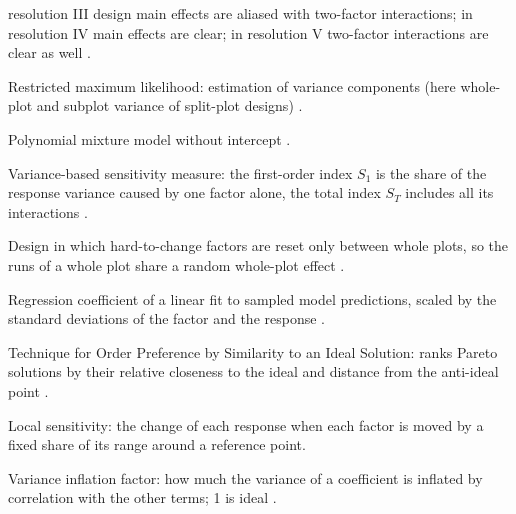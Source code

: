 \begin{description}[style=nextline,leftmargin=2em]
  resolution III design main effects are aliased with two-factor interactions; in resolution IV main effects are
  clear; in resolution V two-factor interactions are clear as well \citep{montgomery2017}.
\item[REML] Restricted maximum likelihood: estimation of variance components (here whole-plot and subplot variance
  of split-plot designs) \citep{patterson1971}.
\item[Scheff\'e model] Polynomial mixture model without intercept \citep{scheffe1958}.
\item[Sobol index] Variance-based sensitivity measure: the first-order index $S_1$ is the share of the response
  variance caused by one factor alone, the total index $S_T$ includes all its interactions
  \citep{sobol2001,saltelli2010,jansen1999}.
\item[Split-plot design] Design in which hard-to-change factors are reset only between whole plots, so the runs of a
  whole plot share a random whole-plot effect \citep{goos2011}.
\item[Standardized regression coefficient] Regression coefficient of a linear fit to sampled model predictions,
  scaled by the standard deviations of the factor and the response \citep{saltelli2008}.
\item[TOPSIS] Technique for Order Preference by Similarity to an Ideal Solution: ranks Pareto solutions by their
  relative closeness to the ideal and distance from the anti-ideal point \citep{hwang1981}.
\item[Tornado chart] Local sensitivity: the change of each response when each factor is moved by a fixed share of
  its range around a reference point.
\item[VIF] Variance inflation factor: how much the variance of a coefficient is inflated by correlation with the
  other terms; 1 is ideal \citep{belsley1980}.
\end{description}
